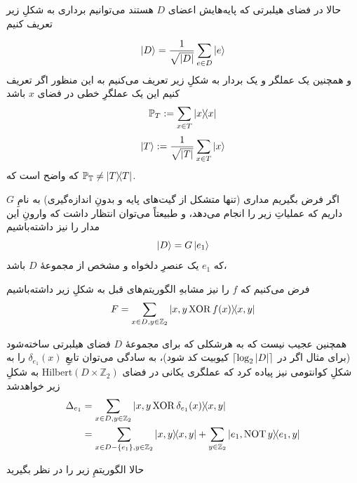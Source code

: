 حالا در فضای هیلبرتی که پایه‌هایش اعضای $D$ هستند می‌توانیم برداری به شکلِ زیر تعریف کنیم

\begin{equation}
    \ket{D} = \frac{1}{\sqrt{\abs{D}}} \sum_{e \in D} \ket{e}
\end{equation}
و همچنین یک عملگر و یک بردار به شکلِ زیر تعریف می‌کنیم
به این منظور اگر تعریف کنیم این یک عملگرِ خطی در فضای $x$ باشد
\begin{equation}
    \mathbb{P}_T := \sum_{x \in T} \dyad{x} 
\end{equation}
\begin{equation}
    \ket{T} :=  \frac{1}{\sqrt{\abs{T}}} \sum_{x \in T} \ket{x}
\end{equation}
که واضح است که 
$\mathbb{P_T} \ne \dyad{T}$.

اگر فرض بگیریم مداری (تنها متشکل از گیت‌های پایه و بدونِ اندازه‌گیری) به نامِ $G$ داریم که عملیاتِ زیر را انجام می‌دهد، و طبیعتاً می‌توان انتظار داشت که وارونِ این مدار را نیز داشته‌باشیم
\begin{equation}
    \ket{D} = G\ket{e_1}
\end{equation}
که $e_1$ یک عنصرِ دلخواه و مشخص از مجموعهٔ $D$ باشد،

فرض می‌کنیم که $f$ را نیز مشابهِ الگوریتم‌های قبل به شکلِ زیر داشته‌باشیم
\begin{equation}
    F = \sum_{x \in D, y \in \mathbb{Z}_2} \dyad{x, y \XOR f(x)}{x, y}
\end{equation}

همچنین عجیب نیست که به هرشکلی که برای مجموعهٔ $D$ فضای هیلبرتی ساخته‌شود (برای مثال اگر در 
$\lceil \log_2 \abs{D} \rceil$
 کیوبیت کد شود)، به سادگی می‌توان تابعِ $\delta_{e_1}(x)$ را به شکلِ کوانتومی نیز پیاده کرد که عملگری یکانی در فضای 
 $\mathrm{Hilbert}(D \times \mathbb{Z}_2)$
 به شکلِ زیر خواهدشد
\begin{align}
    \Delta_{e_1} &= \sum_{x \in D, y \in \mathbb{Z}_2} \dyad{x, y \XOR \delta_{e_1}(x)}{x, y} \\
    &= \sum_{x \in D - \{e_1\}, y \in \mathbb{Z}_2} \dyad{x, y} + \sum_{y \in \mathbb{Z}_2} \dyad{e_1, \NOT y}{e_1, y}
\end{align}

حالا الگوریتمِ زیر را در نظر بگیرید

